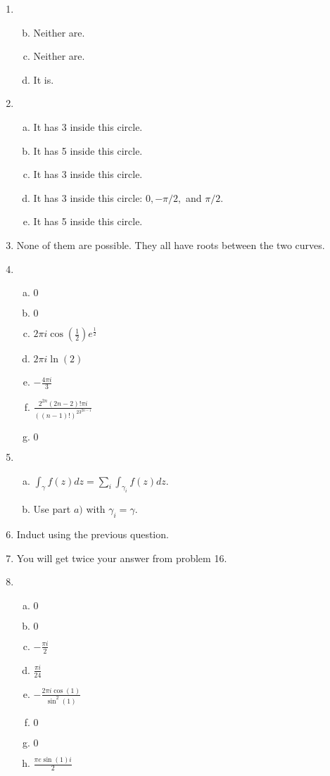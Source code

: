 \begin{enumerate}
\item \begin{enumerate}[a)]
\setcounter{enumii}{1}
\item Neither are.
\item Neither are.
\item It is.
\end{enumerate}

\item \begin{enumerate}[a)]
\item It has 3 inside this circle.
\item It has 5 inside this circle.
\item It has 3 inside this circle.
\item It has 3 inside this circle: $0, -\pi/2,$ and $\pi/2$.
\item It has 5 inside this circle.
\end{enumerate}

\item None of them are possible. They all have roots between the two curves.

\item \begin{enumerate}[a)]
\item $0$
\item $0$
\item $2\pi i \cos\left(\frac{1}{2}\right)e^{\frac{1}{2}}$
\item $2\pi i \ln(2)$
\item $-\frac{4\pi i}{3}$
\item $\frac{2^{2n}(2n-2)!\pi i}{((n-1)!)^23^{2n-1}}$
\item $0$
\end{enumerate}

\item \begin{enumerate}[a)]
\item $\int_{\gamma} f(z)dz = \sum_i \int_{\gamma_i} f(z)dz$.
\item Use part $a)$ with $\gamma_i =\gamma$.
\end{enumerate}

\item Induct using the previous question.

\item You will get twice your answer from problem 16.

\item \begin{enumerate}[a)]
\item $0$
\item $0$
\item $-\frac{\pi i}{2}$
\item $\frac{\pi i}{24}$
\item $-\frac{2\pi i \cos(1)}{\sin^2(1)}$
\item $0$
\item $0$
\item $\frac{\pi e \sin(1) i}{2}$

\end{enumerate}

\end{enumerate}


